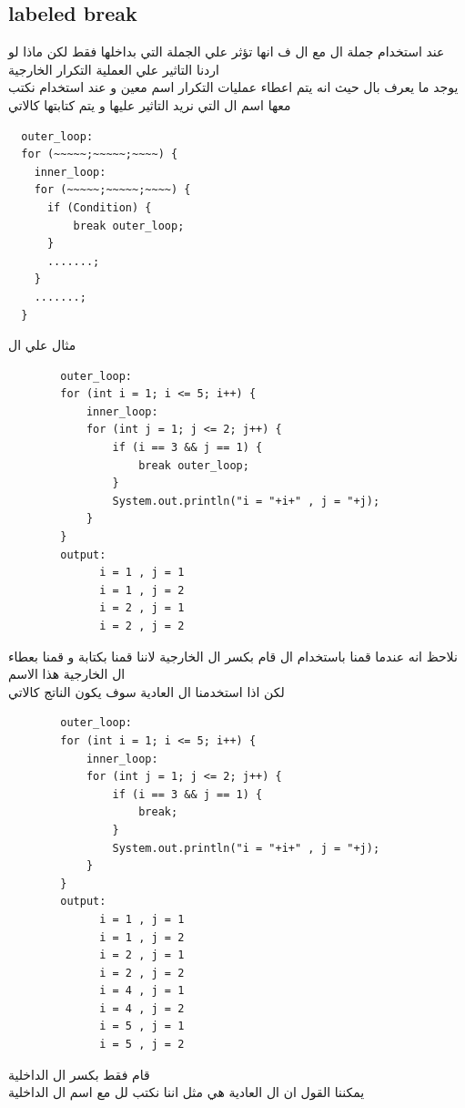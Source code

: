 \subsection{labeled break}
\begin{AR}
  عند استخدام جملة ال  مع ال ف انها تؤثر علي الجملة التي بداخلها فقط لكن ماذا لو اردنا التاثير علي العملية التكرار الخارجية
  \\
  يوجد ما يعرف بال حيث انه يتم اعطاء عمليات التكرار اسم معين  
  و عند استخدام  نكتب معها اسم ال  التي نريد التاثير عليها و يتم كتابتها كالاتي
\end{AR}
\begin{verbatim}
  outer_loop:
  for (~~~~~;~~~~~;~~~~) {
    inner_loop:
    for (~~~~~;~~~~~;~~~~) {
      if (Condition) {
          break outer_loop;
      }
      .......;
    }
    .......;
  }
\end{verbatim}
\begin{AR}
مثال علي ال
\end{AR}
\begin{verbatim}
        outer_loop:
        for (int i = 1; i <= 5; i++) {
            inner_loop:
            for (int j = 1; j <= 2; j++) {
                if (i == 3 && j == 1) {
                    break outer_loop;
                }
                System.out.println("i = "+i+" , j = "+j);
            }
        }
        output:
              i = 1 , j = 1
              i = 1 , j = 2
              i = 2 , j = 1
              i = 2 , j = 2
\end{verbatim}
\begin{AR}
نلاحظ انه عندما قمنا باستخدام ال قام بكسر ال الخارجية لاننا قمنا بكتابة  و قمنا بعطاء
ال  الخارجية هذا الاسم 
\\
لكن اذا استخدمنا ال  العادية سوف يكون الناتج كالاتي
\end{AR}
\begin{verbatim}
        outer_loop:
        for (int i = 1; i <= 5; i++) {
            inner_loop:
            for (int j = 1; j <= 2; j++) {
                if (i == 3 && j == 1) {
                    break;
                }
                System.out.println("i = "+i+" , j = "+j);
            }
        }
        output:
              i = 1 , j = 1
              i = 1 , j = 2
              i = 2 , j = 1
              i = 2 , j = 2
              i = 4 , j = 1
              i = 4 , j = 2
              i = 5 , j = 1
              i = 5 , j = 2
\end{verbatim}
  \begin{AR}
  قام فقط بكسر ال  الداخلية 
  \\
  يمكننا القول ان ال  العادية 
  هي مثل اننا نكتب  لل مع اسم ال الداخلية
  \end{AR}

